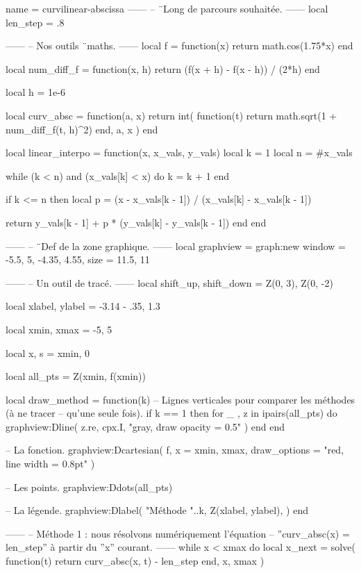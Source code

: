 \documentclass{standalone}
\begin{document}
\begin{luadraw}{name = curvilinear-abscissa}
------
-- ¨Long de parcours souhaitée.
------
local len_step = .8

------
-- Nos outils ¨maths.
------
local f = function(x)
  return math.cos(1.75*x)
end

local num_diff_f = function(x, h)
  return (f(x + h) - f(x - h)) / (2*h)
end

local h = 1e-6

local curv_absc = function(a, x)
  return int(
    function(t)
      return math.sqrt(1 + num_diff_f(t, h)^2)
    end,
    a, x
  )
end

local linear_interpo = function(x, x_vals, y_vals)
  local k = 1
  local n = #x_vals

  while (k < n) and (x_vals[k] < x) do
    k = k + 1
  end

  if k <= n then
    local p = (x - x_vals[k - 1]) / (x_vals[k] - x_vals[k - 1])

    return y_vals[k - 1] + p * (y_vals[k] - y_vals[k - 1])
  end
end

------
-- ¨Def de la zone graphique.
------
local graphview = graph:new{
  window = {-5.5, 5, -4.35, 4.55},
  size   = {11.5, 11}
}

------
-- Un outil de tracé.
------
local shift_up, shift_down = Z(0, 3), Z(0, -2)

local xlabel, ylabel = -3.14 - .35, 1.3

local xmin, xmax = -5, 5

local x, s = xmin, 0

local all_pts = {Z(xmin, f(xmin))}

local draw_method = function(k)
-- Lignes verticales pour comparer les méthodes (à ne tracer
-- qu'une seule fois).
  if k == 1 then
    for _ , z in ipairs(all_pts) do
      graphview:Dline(
        {z.re, cpx.I},
        "gray, draw opacity = 0.5"
      )
    end
  end

-- La fonction.
  graphview:Dcartesian(
    f,
    {
      x = {xmin, xmax},
      draw_options = "red, line width = 0.8pt"
    }
  )

-- Les points.
  graphview:Ddots(all_pts)

-- La légende.
  graphview:Dlabel(
    "Méthode "..k, Z(xlabel, ylabel), {}
  )
end

------
-- Méthode 1 : nous résolvons numériquement l'équation
-- ''curv_absc(x) = len_step'' à partir du ''x'' courant.
------
while x < xmax do
  local x_next = solve(
    function(t)
      return curv_absc(x, t) - len_step
    end,
    x, xmax
  )


\end{luadraw}
\end{document}
